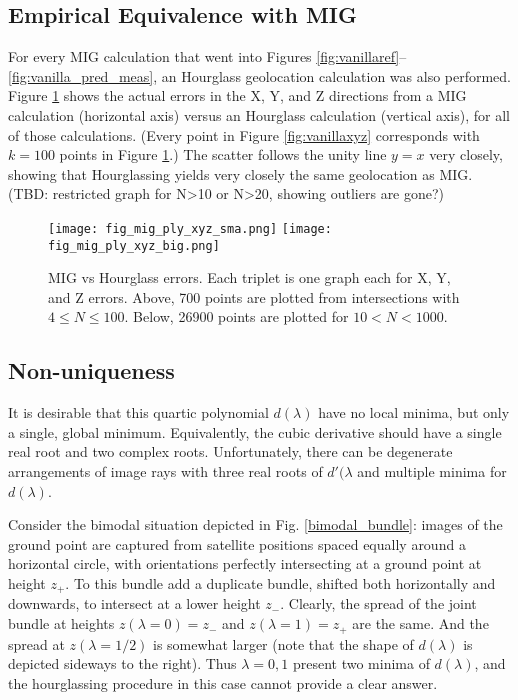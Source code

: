 \documentclass[11pt]{amsart}
\begin{document}
\subsection{Empirical Equivalence with MIG}
For every MIG calculation that went into Figures
\ref{fig:vanillaref}--\ref{fig:vanilla_pred_meas}, an Hourglass geolocation
calculation was also performed. Figure \ref{fig:mig_vs_hourglass} shows the
actual errors in the X, Y, and Z directions from a MIG calculation (horizontal
axis) versus an Hourglass calculation (vertical axis), for all of those
calculations. (Every point in Figure \ref{fig:vanillaxyz} corresponds with
$k=100$ points in Figure \ref{fig:mig_vs_hourglass}.) The scatter follows the
unity line $y=x$ very closely, showing that Hourglassing yields very closely the
same geolocation as MIG. (TBD: restricted graph for N>10 or N>20, showing
outliers are gone?)

\begin{figure}
\texttt{[image: fig\_mig\_ply\_xyz\_sma.png]}
\texttt{[image: fig\_mig\_ply\_xyz\_big.png]}
\caption{\label{fig:mig_vs_hourglass}MIG vs Hourglass errors.  Each triplet is
  one graph each for X, Y, and Z errors. Above, 700 points are plotted from
  intersections with $4\le N\le 100$. Below, 26900 points are plotted for
  $10<N<1000$.}
\end{figure}


\subsection{Non-uniqueness}
It is desirable that this quartic polynomial $d(\lambda)$ have no
local minima, but only a single, global minimum. Equivalently, the
cubic derivative should have a single real root and two complex
roots. Unfortunately, there can be degenerate arrangements of image
rays with three real roots of $d'(\lambda$ and multiple minima for
$d(\lambda)$.

Consider the bimodal situation depicted in Fig. \ref{bimodal_bundle}:
images of the ground point are captured from satellite positions
spaced equally around a horizontal circle, with orientations perfectly
intersecting at a ground point at height $z_+$. To this bundle add a
duplicate bundle, shifted both horizontally and downwards, to
intersect at a lower height $z_-$. Clearly, the spread of the joint
bundle at heights $z(\lambda=0)=z_-$ and $z(\lambda=1)=z_+$ are the
same. And the spread at $z(\lambda=1/2)$ is somewhat larger (note that
the shape of $d(\lambda)$ is depicted sideways to the right). Thus
$\lambda={0,1}$ present two minima of $d(\lambda)$, and the
hourglassing procedure in this case cannot provide a clear answer.
\end{document}
